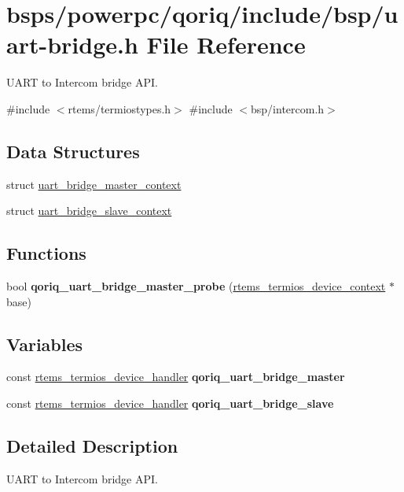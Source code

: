 \hypertarget{uart-bridge_8h}{}\section{bsps/powerpc/qoriq/include/bsp/uart-\/bridge.h File Reference}
\label{uart-bridge_8h}


U\+A\+RT to Intercom bridge A\+PI.  


{\ttfamily \#include $<$rtems/termiostypes.\+h$>$}\newline
{\ttfamily \#include $<$bsp/intercom.\+h$>$}\newline
\subsection*{Data Structures}
\begin{DoxyCompactItemize}
\item 
struct \mbox{\hyperlink{structuart__bridge__master__context}{uart\+\_\+bridge\+\_\+master\+\_\+context}}
\item 
struct \mbox{\hyperlink{structuart__bridge__slave__context}{uart\+\_\+bridge\+\_\+slave\+\_\+context}}
\end{DoxyCompactItemize}
\subsection*{Functions}
\begin{DoxyCompactItemize}
\item 
bool {\bfseries qoriq\+\_\+uart\+\_\+bridge\+\_\+master\+\_\+probe} (\mbox{\hyperlink{structrtems__termios__device__context}{rtems\+\_\+termios\+\_\+device\+\_\+context}} $\ast$base)
\end{DoxyCompactItemize}
\subsection*{Variables}
\begin{DoxyCompactItemize}
\item 
const \mbox{\hyperlink{structrtems__termios__device__handler}{rtems\+\_\+termios\+\_\+device\+\_\+handler}} {\bfseries qoriq\+\_\+uart\+\_\+bridge\+\_\+master}
\item 
const \mbox{\hyperlink{structrtems__termios__device__handler}{rtems\+\_\+termios\+\_\+device\+\_\+handler}} {\bfseries qoriq\+\_\+uart\+\_\+bridge\+\_\+slave}
\end{DoxyCompactItemize}


\subsection{Detailed Description}
U\+A\+RT to Intercom bridge A\+PI. 

